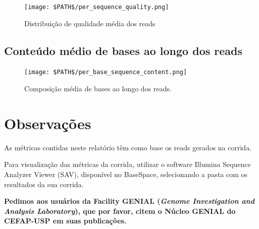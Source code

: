 \documentclass[a4paper]{article}
\begin{document}
\begin{figure}[!htbp]
\centering
\texttt{[image: \$PATH\$/per\_sequence\_quality.png]}
\caption{Distribuição de qualidade média dos reads}
\label{FigQualidadeMediaReads}
\end{figure}

\pagebreak

\subsection*{Conteúdo médio de bases ao longo dos reads}

\begin{figure}[!htbp]
\centering
\texttt{[image: \$PATH\$/per\_base\_sequence\_content.png]}
\caption{Composição média de bases ao longo dos reads.}
\label{FigQualidadeMediaReads}
\end{figure}

\section*{Observações}

As métricas contidas neste relatório têm como base os reads gerados na corrida.

Para visualização das métricas da corrida, utilizar o software Illumina Sequence Analyzer Viewer (SAV), disponível no BaseSpace, selecionando a pasta com os resultados da sua corrida.

\bigskip
\textbf{Pedimos aos usuários da Facility GENIAL (\textit{Genome Investigation and Analysis Laboratory}), que por favor, citem o
Núcleo GENIAL do CEFAP-USP em suas publicações.}
\end{document}
